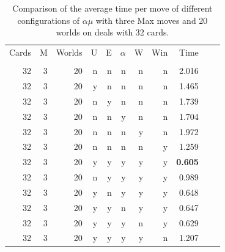 \documentclass[letterpaper]{article} %
\begin{document}
\begin{table}
  \centering
  \caption{Comparison of the average time per move of different
  configurations of $\alpha\mu$ with three Max moves and 20 worlds on deals with 32 cards.}
  \label{tableTime-3-20-32}
  \begin{tabular}{rrrrrrrrrrr}
Cards & M & Worlds & U & E & $\alpha$ & W & Win &  Time\\
      &   &        &    &   &         &   &     &      \\
   32 & 3 &     20 &  n & n &       n & n &   n & 2.016\\
   32 & 3 &     20 &  y & n &       n & n &   n & 1.465\\
   32 & 3 &     20 &  n & y &       n & n &   n & 1.739\\
   32 & 3 &     20 &  n & n &       y & n &   n & 1.704\\
   32 & 3 &     20 &  n & n &       n & y &   n & 1.972\\
   32 & 3 &     20 &  n & n &       n & n &   y & 1.259\\
   32 & 3 &     20 &  y & y &       y & y &   y & \bf 0.605\\
   32 & 3 &     20 &  n & y &       y & y &   y & 0.989\\
   32 & 3 &     20 &  y & n &       y & y &   y & 0.648\\
   32 & 3 &     20 &  y & y &       n & y &   y & 0.647\\
   32 & 3 &     20 &  y & y &       y & n &   y & 0.629\\
   32 & 3 &     20 &  y & y &       y & y &   n & 1.207\\
  \end{tabular}
\end{table}
\end{document}
